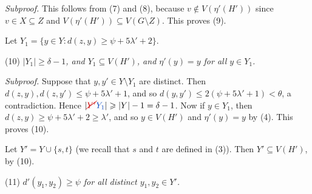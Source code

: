 \textit{Subproof.} This follows from (7) and (8), because $v \notin V(\eta'(H'))$ since $v \in X \subseteq Z$ and $V(\eta'(H')) \subseteq V(G \setminus Z)$. This proves (9).

Let $Y_1 = \{y \in Y \colon d(z, y) \ge \psi + 5\lambda' + 2\}$.

\hspace*{12pt}(10) \textit{$|Y_1| \ge \delta - 1$, and $Y_1 \subseteq V(H')$, and $\eta'(y) = y$ for all $y \in Y_1$.}

\textit{Subproof.} Suppose that $y, y' \in Y \setminus Y_1$ are distinct. Then $d(z, y), d(z, y') \le \psi + 5\lambda' + 1$, and so $d(y, y') \le 2(\psi + 5\lambda' + 1) < \theta$, a contradiction. Hence $|\delm{Y'}\fix{Y_1}| \ge |Y| - 1 = \delta - 1$. Now if $y \in Y_1$, then $d(z, y) \ge \psi + 5\lambda' + 2 \ge \lambda'$, and so $y \in V(H')$ and $\eta'(y) = y$ by (4). This proves (10).

Let $Y' = Y \cup \{s, t\}$ (we recall that $s$ and $t$ are defined in (3)). Then $Y' \subseteq V(H')$, by (10).

\hspace*{12pt}(11) \textit{$d'(y_1, y_2) \ge \psi$ for all distinct $y_1, y_2 \in Y'$.}

